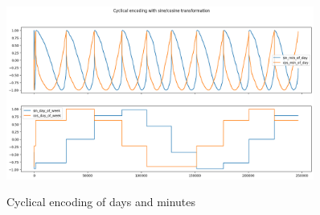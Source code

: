 \documentclass[12pt]{article}
\begin{document}
\begin{figure}[h]
    \centering
    \includegraphics[width=0.9\textwidth]{cyclical encoding.png}\\
    \caption{Cyclical encoding of days and minutes}
    \label{fig:Cyclical encoding of days and minutes}
\end{figure}
\FloatBarrier
\end{document}
